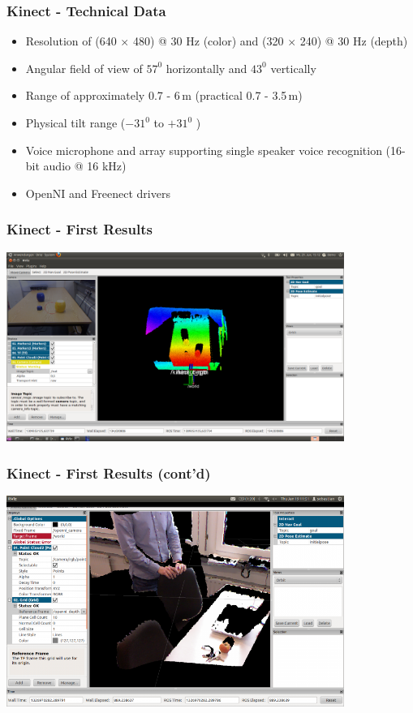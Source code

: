\begin{frame}
 \frametitle{Kinect - Technical Data}
\begin{itemize}
  \item Resolution of (640 $\times$ 480) @ 30 Hz (color) and (320 $\times$ 240) @ 30 Hz (depth)
  \item Angular field of view of $57^0$ horizontally and $43^0$ vertically
  \item Range of approximately 0.7 - 6\,m (practical 0.7 - 3.5\,m)
  \item Physical tilt range ($-31^0$  to $+31^0$ )
  \item Voice microphone and array supporting single speaker voice recognition (16-bit audio @ 16 kHz)
  \item OpenNI and Freenect drivers
\end{itemize}

\end{frame}


\begin{frame} 
 \frametitle{Kinect - First Results}
\includegraphics[width=11cm]{images/ros_rviz.png}
\end{frame}

\begin{frame} 
 \frametitle{Kinect - First Results (cont'd)}
\includegraphics[width=11cm]{images/Openni_rgb.png}
\end{frame}



